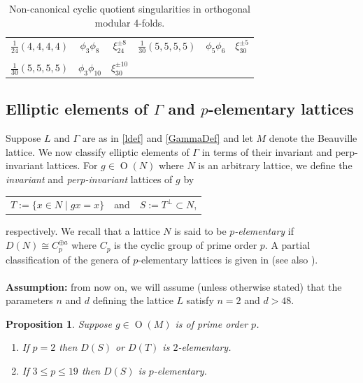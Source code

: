 \documentclass[12pt, a4paper]{article}
\newtheorem{proposition}[thm]{Proposition}
\newcommand{\opn}{\operatorname}
\newcommand{\op}{\oplus}
\begin{document}
\begin{table}
\begin{tabular}{|c|c|c||c|c|c|}
    $\frac{1}{24}(4,4,4,4)$ & $\phi_{3} \phi_{8} $& $\xi_{24}^{\pm 8}$ & 
    
    $\frac{1}{30}(5,5,5,5)$ & $\phi_{5} \phi_{6} $& $\xi_{30}^{\pm 5}$ \\
      & & & & & \\[-1em]  
    
    $\frac{1}{30}(5,5,5,5)$ & $\phi_{3} \phi_{10} $& $\xi_{30}^{\pm 10}$       & & & \\  
    \hline
  \end{tabular}
  \caption{Non-canonical cyclic quotient singularities in orthogonal modular 4-folds.} \label{SingTable}
\end{table}
\subsection{Elliptic elements of $\Gamma$ and $p$-elementary lattices}
Suppose $L$ and $\Gamma$ are as in \eqref{ldef} and \eqref{GammaDef} and let $M$ denote the Beauville lattice.
We now classify elliptic elements of $\Gamma$ in terms of their invariant and perp-invariant lattices.
For $g \in \opn{O}(N)$ where $N$ is an arbitrary lattice, we define the \emph{invariant} and \emph{perp-invariant} lattices of $g$ by
\begin{center}
  \begin{tabular}{c c c}
    $T := \{ x \in N \mid gx=x \}$ & and &   $S:=T^{\perp} \subset N$,
  \end{tabular}
  \end{center}
respectively.
We recall that a lattice $N$ is said to be \emph{$p$-elementary} if $D(N) \cong C_p^{\op a}$ where $C_p$ is the cyclic group of prime order $p$.
A partial classification of the genera of $p$-elementary lattices is given in \cite{RudakovShafarevich1, RudakovShafarevich2} (see also \cite{SPLAG}).
${}$
\\
\\
\noindent \textbf{Assumption:} from now on, we will assume (unless otherwise stated) that the parameters $n$ and $d$ defining the lattice $L$ satisfy $n=2$ and $d>48$.
${}$
\\
\begin{proposition}\label{pelemProp}
  Suppose $g \in \opn{O}(M)$ is of prime order $p$.  
  \begin{enumerate}
  \item If $p=2$ then $D(S)$ or $D(T)$ is $2$-elementary.
  \item If $3 \leq p \leq 19$ then $D(S)$ is $p$-elementary.
  \end{enumerate}
\end{proposition}
\end{document}

